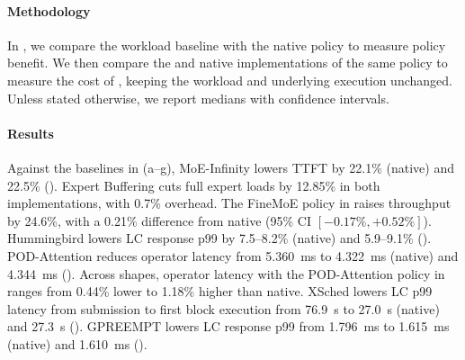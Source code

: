 \paragraph{Methodology}
In , we compare the workload baseline with the native policy to measure policy benefit.
We then compare the \sys{} and native implementations of the same policy to measure the cost of \sys{}, keeping the workload and underlying execution unchanged.
Unless stated otherwise, we report medians with confidence intervals.

\paragraph{Results}
Against the baselines in (a--g), MoE-Infinity lowers TTFT by 22.1\% (native) and 22.5\% (\sys{}).
Expert Buffering cuts full expert loads by 12.85\% in both implementations, with 0.7\% \sys{} overhead.
The FineMoE policy in \sys{} raises throughput by 24.6\%, with a 0.21\% difference from native (95\% CI $[-0.17\%,+0.52\%]$).
Hummingbird lowers LC response p99 by 7.5--8.2\% (native) and 5.9--9.1\% (\sys{}).
POD-Attention reduces operator latency from 5.360~ms to 4.322~ms (native) and 4.344~ms (\sys{}).
Across shapes, operator latency with the POD-Attention policy in \sys{} ranges from 0.44\% lower to 1.18\% higher than native.
XSched lowers LC p99 latency from submission to first block execution from 76.9~s to 27.0~s (native) and 27.3~s (\sys{}).
GPREEMPT lowers LC response p99 from 1.796~ms to 1.615~ms (native) and 1.610~ms (\sys{}).

